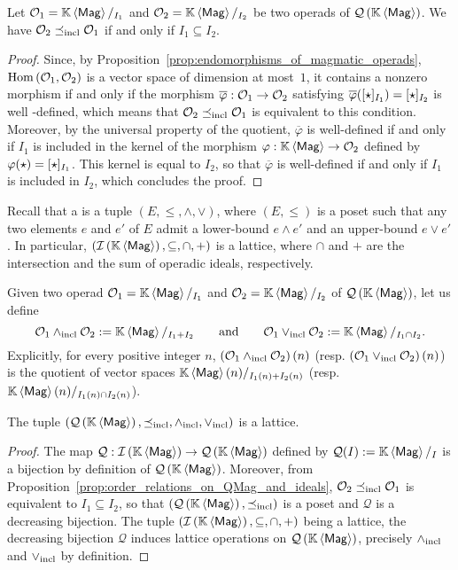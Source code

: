 \begin{Proposition} \label{prop:order_relations_on_QMag_and_ideals}
    Let $\Oca_1=\KMag/_{I_1}$ and $\Oca_2=\KMag/_{I_2}$ be two operads
    of $\QMag$. We have $\Oca_2\OrdQMag\Oca_1$ if and only if
    $I_1\subseteq I_2$.
\end{Proposition}
\begin{proof}
  Since, by Proposition~\ref{prop:endomorphisms_of_magmatic_operads},
  $\Hom\left(\Oca_1,\Oca_2\right)$ is a vector space of
  dimension at most~$1$, it contains a nonzero morphism if and only if
  the morphism $\overline{\varphi}:\Oca_1\to\Oca_2$ satisfying
  $\overline{\varphi}([\Product]_{I_1})=[\Product]_{I_2}$ is well
  -defined, which means that $\Oca_2\OrdQMag\Oca_1$ is equivalent to this
  condition. Moreover, by the universal property of the quotient,
  $\overline{\varphi}$ is well-defined if and only if $I_1$ is included
  in the kernel of the morphism $\varphi:\KMag\to\Oca_2$ defined by
  $\varphi(\Product)=[\Product]_{I_1}$. This kernel is equal to
  $I_2$, so that $\overline{\varphi}$ is well-defined if and only if
  $I_1$ is included in $I_2$, which concludes the proof.
\end{proof}
\medbreak

Recall that a  is a tuple
$\left(E,\leq,\wedge,\vee\right)$, where $\left(E,\leq\right)$ is a
poset such that any two elements $e$ and $e'$ of $E$ admit a lower-bound
$e\wedge e'$ and an upper-bound $e\vee e'$. In particular,
$\left(\IMag,\subseteq,\cap,+\right)$ is a lattice, where $\cap$ and $+$
are the intersection and the sum of operadic ideals, respectively.
\medbreak

Given two operad $\Oca_1=\KMag/_{I_1}$ and $\Oca_2=\KMag/_{I_2}$ of
$\QMag$, let us define
\begin{equation} \label{equ:definition_of_lattice_operations_of_QMag}
    \Oca_1\InfQMag \Oca_2 := \KMag/_{I_1+I_2}
    \qquad \mbox{and} \qquad
    \Oca_1\SupQMag \Oca_2 := \KMag/_{I_1\cap I_2}.
\end{equation}
Explicitly, for every positive integer $n$,
$\left(\Oca_1\InfQMag\Oca_2\right)(n)$ (resp.
$\left(\Oca_1\SupQMag\Oca_2\right)(n)$) is the quotient of vector spaces
$\KMag(n)/_{I_1(n)+I_2(n)}$ (resp.
$\KMag(n)/_{I_1(n)\cap I_2(n)}$).
\medbreak

\begin{Theorem} \label{thm:lattice_structure_of_QMag}
    The tuple $\LatQMag$ is a lattice.
\end{Theorem}
\begin{proof}
    The map $\mathcal{Q}:\IMag\to\QMag$ defined by
    $\mathcal{Q}(I) := \KMag/_I$ is a bijection by definition of
    $\QMag$. Moreover, from
    Proposition~\ref{prop:order_relations_on_QMag_and_ideals},
    $\Oca_2\OrdQMag\Oca_1$ is equivalent to $I_1\subseteq I_2$, so that
    $\left(\QMag,\OrdQMag\right)$ is a poset and $\mathcal{Q}$ is a
    decreasing bijection. The tuple
    $\left(\IMag,\subseteq,\cap,+\right)$ being a lattice, the
    decreasing bijection $\mathcal{Q}$ induces lattice operations on
    $\QMag$, precisely $\InfQMag$ and $\SupQMag$ by definition.
\end{proof}
\medbreak

